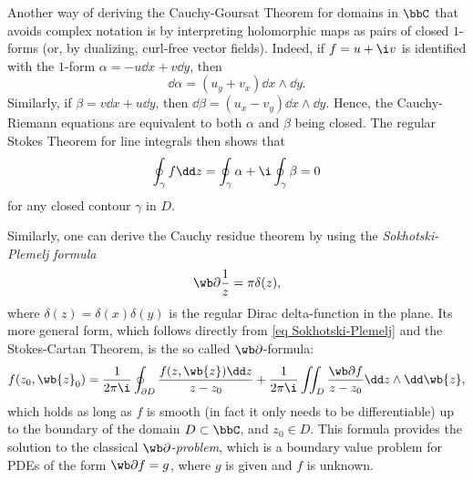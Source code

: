 \begin{rem}
    Another way of deriving the Cauchy-Goursat Theorem for domains in $\bbC$ that avoids complex notation is by interpreting holomorphic maps as pairs of closed $1$-forms (or, by dualizing, curl-free vector fields). Indeed, if $f=u+\i v$ is identified with the $1$-form $\alpha=-u\dd x+v\dd y$, then 
    \[\dd\alpha=(u_y+v_x)\dd x\wedge\dd y.\]
    Similarly, if $\beta=v\dd x+u\dd y$, then $\dd \beta=(u_x-v_y)\dd x\wedge\dd y$. Hence, the Cauchy-Riemann equations are equivalent to both $\alpha$ and $\beta$ being closed. The regular Stokes Theorem for line integrals then shows that 
    \[\oint_\gamma f\dd z=\oint_\gamma\alpha+\i \oint_\gamma \beta=0\] for any closed contour $\gamma$ in $D$.
\end{rem}

\begin{rem}
    Similarly, one can derive the Cauchy residue theorem by using the \emph{Sokhotski-Plemelj formula} 
    \[\wb\partial \frac{1}{z}=\pi \delta(z),\label{eq Sokhotski-Plemelj}\] where $\delta(z)=\delta(x)\delta(y)$ is the regular Dirac delta-function in the plane. Its more general form, which follows directly from \eqref{eq Sokhotski-Plemelj} and the Stokes-Cartan Theorem, is the so called $\wb\partial$-formula:
    \[f(z_0,\wb{z}_0)=\frac{1}{2\pi \i}\oint_{\partial D}\frac{f(z,\wb{z})\dd z}{z-z_0}+\frac{1}{2\pi\i}\iint_D \frac{\wb\partial f}{z-z_0}\dd z\wedge\dd\wb{z},\label{eq dbar formula}\]
    which holds as long as $f$ is smooth (in fact it only needs to be differentiable) up to the boundary of the domain $D\subset\bbC$, and $z_0\in D$.
    This formula provides the solution to the classical \emph{$\wb\partial$-problem}, which is a boundary value problem for PDEs of the form $\wb\partial f=g$, where $g$ is given and $f$ is unknown.
\end{rem}


